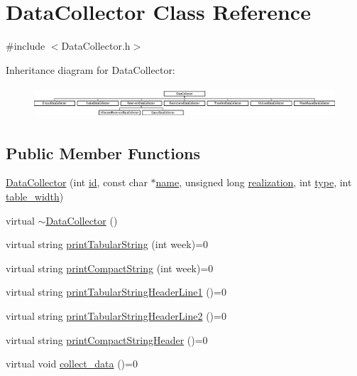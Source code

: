 \hypertarget{classDataCollector}{}\section{Data\+Collector Class Reference}
\label{classDataCollector}


{\ttfamily \#include $<$Data\+Collector.\+h$>$}

Inheritance diagram for Data\+Collector\+:\begin{figure}[H]
\begin{center}
\leavevmode
\includegraphics[height=1.170732cm]{classDataCollector}
\end{center}
\end{figure}
\subsection*{Public Member Functions}
\begin{DoxyCompactItemize}
\item 
\mbox{\hyperlink{classDataCollector_a3f89b18f4ac0557d7374d49531a004c0}{Data\+Collector}} (int \mbox{\hyperlink{classDataCollector_a5cb840b6fbcf6afe364eef9114984383}{id}}, const char $\ast$\mbox{\hyperlink{classDataCollector_a3a9a5033592f72ada429aa20056162b9}{name}}, unsigned long \mbox{\hyperlink{classDataCollector_a9ef2887466fe3123aa19ef956a219b96}{realization}}, int \mbox{\hyperlink{classDataCollector_acad1c22d67a8eb3db056ba776a131900}{type}}, int \mbox{\hyperlink{classDataCollector_af46c27a47de92d92dcdae6b26a905a44}{table\+\_\+width}})
\item 
virtual \mbox{\hyperlink{classDataCollector_a9f9ff1817bd0601ba33925c3378ac50e}{$\sim$\+Data\+Collector}} ()
\item 
virtual string \mbox{\hyperlink{classDataCollector_a397fccabe0223267eea8fc7cac0e59da}{print\+Tabular\+String}} (int week)=0
\item 
virtual string \mbox{\hyperlink{classDataCollector_a2eac264fa5612aed5a830b12de4f4ae3}{print\+Compact\+String}} (int week)=0
\item 
virtual string \mbox{\hyperlink{classDataCollector_a91619cfa9e9b8cefd2f7c20d5718b41e}{print\+Tabular\+String\+Header\+Line1}} ()=0
\item 
virtual string \mbox{\hyperlink{classDataCollector_af01ea961314be2164f39e6d4cd59e443}{print\+Tabular\+String\+Header\+Line2}} ()=0
\item 
virtual string \mbox{\hyperlink{classDataCollector_a98dcb4ec871d9c7fbf7545c64e5ccc67}{print\+Compact\+String\+Header}} ()=0
\item 
virtual void \mbox{\hyperlink{classDataCollector_a01486bf58acbe37b203f97b3b9a79c40}{collect\+\_\+data}} ()=0
\end{DoxyCompactItemize}
